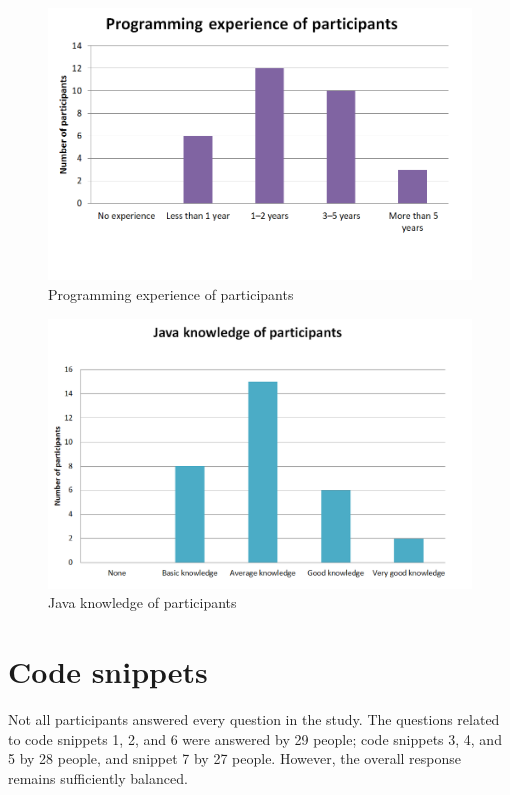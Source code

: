 \begin{figure} [H]
  \centering
  \includegraphics[scale=0.8]{figures/p_exp.png}
  \caption{Programming experience of participants}
  \label{fig:AnhangsChor}
\end{figure}


\begin{figure} [H]
  \centering
  \includegraphics[scale=0.85]{figures/java_kn.png}
  \caption{Java knowledge of participants}
  \label{fig:AnhangsChor}
\end{figure}


\section{Code snippets}
Not all participants answered every question in the study. The questions related to code snippets 1, 2, and 6 were answered by 29 people; code snippets 3, 4, and 5 by 28 people, and snippet 7 by 27 people.  However, the overall response remains sufficiently balanced.

